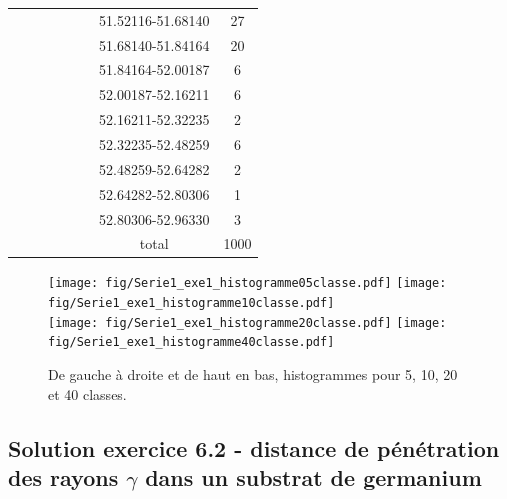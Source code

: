 \begin{table}[p]
\begin{center}
\begin{tabular}{cccccccc}
                                                              & & & & & & 51.52116-51.68140 & 27 \\
                                                              & & & & & & 51.68140-51.84164 & 20 \\
                                                              & & & & & & 51.84164-52.00187 &  6 \\
                                                              & & & & & & 52.00187-52.16211 &  6 \\
                                                              & & & & & & 52.16211-52.32235 &  2 \\
                                                              & & & & & & 52.32235-52.48259 &  6 \\
                                                              & & & & & & 52.48259-52.64282 &  2 \\
                                                              & & & & & & 52.64282-52.80306 &  1 \\
                                                              & & & & & & 52.80306-52.96330 &  3 \\
                                                              & & & & & & total & 1000 \\\hline
\end{tabular}
\end{center}
\label{tab:cl}
\normalsize
\end{table}

\begin{figure}[p]
   \centering
   \texttt{[image: fig/Serie1\_exe1\_histogramme05classe.pdf]} \hspace{5mm}
   \texttt{[image: fig/Serie1\_exe1\_histogramme10classe.pdf]} \\ \vspace{5mm}
   \texttt{[image: fig/Serie1\_exe1\_histogramme20classe.pdf]} \hspace{5mm}
   \texttt{[image: fig/Serie1\_exe1\_histogramme40classe.pdf]}
   \caption{De gauche à droite et de haut en bas, histogrammes pour 5, 10, 20 et 40 classes.}
   \label{fig:hist}
\end{figure}

\newpage

\subsection*{Solution exercice 6.2 - distance de pénétration des rayons $\gamma$ dans un substrat de germanium}

